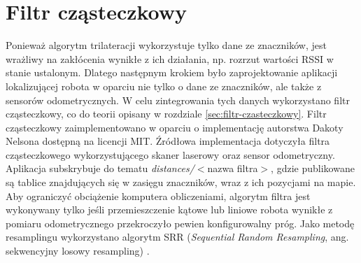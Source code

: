 \section{Filtr cząsteczkowy}
Ponieważ algorytm trilateracji wykorzystuje tylko dane ze znaczników, jest wrażliwy na zakłócenia wynikłe z ich działania, np. rozrzut wartości RSSI w stanie ustalonym. Dlatego następnym krokiem było zaprojektowanie aplikacji lokalizującej robota w oparciu nie tylko o dane ze znaczników, ale także z sensorów odometrycznych. W celu zintegrowania tych danych wykorzystano filtr cząsteczkowy, co do teorii opisany w rozdziale \ref{sec:filtr-czasteczkowy}.
Filtr cząsteczkowy zaimplementowano w oparciu o implementację autorstwa Dakoty Nelsona dostępną na licencji MIT. Źródłowa implementacja dotyczyła filtra cząsteczkowego wykorzystującego skaner laserowy oraz sensor odometryczny. Aplikacja subskrybuje do tematu \textit{distances/}$<$nazwa filtra$>$, gdzie publikowane są tablice znajdujących się w zasięgu znaczników, wraz z ich pozycjami na mapie. Aby ograniczyć obciążenie komputera obliczeniami, algorytm filtra jest wykonywany tylko jeśli przemieszczenie kątowe lub liniowe robota wynikłe z pomiaru odometrycznego przekroczyło pewien konfigurowalny próg. Jako metodę resamplingu wykorzystano algorytm SRR (\textit{Sequential Random Resampling}, ang. sekwencyjny losowy resampling) \cite{jupyter}.